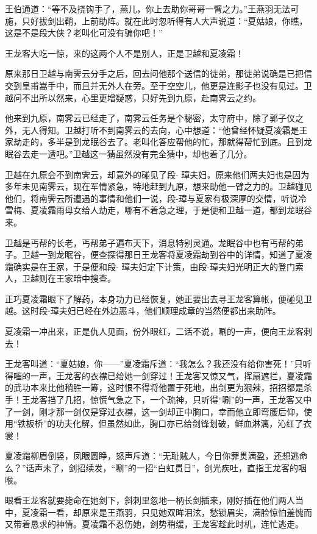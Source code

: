 \documentclass[12pt,oneside]{book}
\begin{document}
王伯通道：``等不及挠钩手了，燕儿，你上去助你哥哥一臂之力。''王燕羽无法可施，只好拔剑出鞘，上前助阵。就在此时忽听得有人大声说道：``夏姑娘，你瞧，这是不是段大侠？老叫化可没有骗你吧！''

王龙客大吃一惊，来的这两个人不是别人，正是卫越和夏凌霜！

原来那日卫越与南霁云分手之后，回去问他那个送信的徒弟，那徒弟说确是已把信交到皇甫嵩手中，而且并无外人在旁。至于空空儿，他更是连影子也没有见过。卫越问不出所以然来，心里更增疑惑，只好先到九原，赴南霁云之约。

他来到九原，南霁云已经走了，南霁云任务是个秘密，太守府中，除了郭子仪之外，无人得知。卫越打听不到南霁云的去向，心中想道：``他曾经怀疑夏凌霜是王家劫走的，多半是到龙眠谷去了。老叫化答应帮他的忙，那就得帮忙到底。且到龙眠谷去走一遭吧。''卫越这一猜虽然没有完全猜中，却也着了几分。

卫越在九原会不到南霁云，却意外的碰见了段-
璋夫妇，原来他们两夫妇也是因为多年未见南霁云，现在军情紧急，特地赶到九原，想来助他一臂之力的。卫越碰见他们，将南霁云所遭遇的事情和他们一说，段-璋与夏家有极深厚的交情，听说冷雪梅、夏凌霜雨母女给人劫走，哪有不着急之理，于是便和卫越一道，都到龙眠谷来。

卫越是丐帮的长老，丐帮弟子遍布天下，消息特别灵通。龙眠谷中也有丐帮的弟子。卫越一到龙眠谷，便查探得那日王龙客将夏凌霜劫到谷中的详情，知道了夏凌霜确实是在王家，于是便和段-
璋夫妇定下计策，由段-璋夫妇光明正大的登门索人，卫越则在王家暗中搜查。

正巧夏凌霜眼下了解药，本身功力已经恢复，她正要出去寻王龙客算帐，便碰见卫越。这时段-璋夫妇已经在外边恶斗，他们顺理成章的当然便都出来助阵。

夏凌霜一冲出来，正是仇人见面，份外眼红，二话不说，唰的一声，便向王龙客刺去！

王龙客叫道：``夏姑娘，你------''夏凌霜斥道：``我怎么？我还没有给你害死！''只听得嗤的一声，王龙客的衣襟已给她一剑穿过！王龙客又惊又气，挥扇遮拦，夏凌霜的武功本来比他稍胜一筹，这时恨不得将他置于死地，出剑更为狠辣，招招都是杀手！王龙客挡了几招，惊慌气急之下，一个疏神，只听得``唰''的一声，王龙客又中了一剑，刚才那一剑仅是穿过衣襟，这一剑却正中胸口，幸而他立即弯腰后仰，使用``铁板桥''的功夫化解，但虽然如此，胸口亦已给剑锋划破，鲜血淋漓，沁红了衣裳！

夏凌霜柳眉倒竖，凤眼圆睁，怒声斥道：``无耻贼人，今日你罪贯满盈，还想逃命么？''话声未了，剑招续发，``唰''的一招``白虹贯日''，剑光疾吐，直指王龙客的咽喉。

眼看王龙客就要毙命在她剑下，斜刺里忽地一柄长剑插来，刚好插在他们两人当中，夏凌霜一看，却原来是王燕羽，只见她双眸泪泫，愁锁眉尖，满脸惊怕羞愧而又带着恳求的神情。夏凌霜不忍伤她，剑势稍缓，王龙客趁此时机，连忙逃走。
\end{document}
